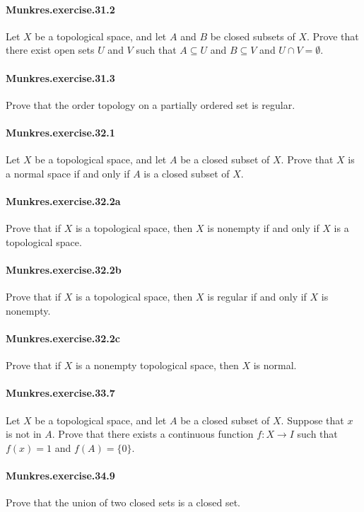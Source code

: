 \documentclass{article}
\begin{document}
\paragraph{Munkres.exercise.31.2} Let $X$ be a topological space, and let $A$ and $B$ be closed subsets of $X$. Prove that there exist open sets $U$ and $V$ such that $A \subseteq U$ and $B \subseteq V$ and $U \cap V = \emptyset$.

\paragraph{Munkres.exercise.31.3} Prove that the order topology on a partially ordered set is regular.

\paragraph{Munkres.exercise.32.1} Let $X$ be a topological space, and let $A$ be a closed subset of $X$. Prove that $X$ is a normal space if and only if $A$ is a closed subset of $X$.

\paragraph{Munkres.exercise.32.2a} Prove that if $X$ is a topological space, then $X$ is nonempty if and only if $X$ is a topological space.

\paragraph{Munkres.exercise.32.2b} Prove that if $X$ is a topological space, then $X$ is regular if and only if $X$ is nonempty.

\paragraph{Munkres.exercise.32.2c} Prove that if $X$ is a nonempty topological space, then $X$ is normal.

\paragraph{Munkres.exercise.33.7} Let $X$ be a topological space, and let $A$ be a closed subset of $X$. Suppose that $x$ is not in $A$. Prove that there exists a continuous function $f : X \to I$ such that $f(x)=1$ and $f(A)=\{0\}$.

\paragraph{Munkres.exercise.34.9} Prove that the union of two closed sets is a closed set.
\end{document}
